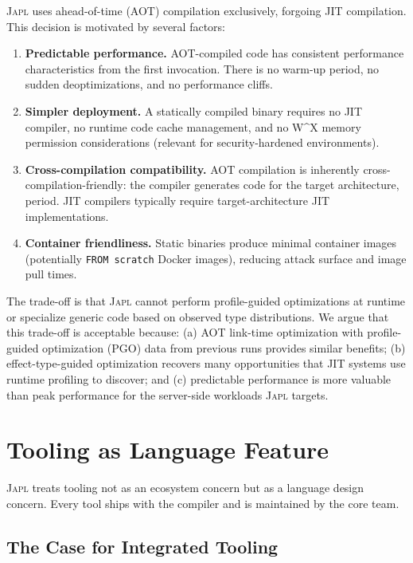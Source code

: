 \documentclass[11pt,twocolumn]{article}
\newcommand{\japl}{\textsc{Japl}}
\begin{document}
\japl{} uses ahead-of-time (AOT) compilation exclusively, forgoing JIT compilation.
This decision is motivated by several factors:

\begin{enumerate}[leftmargin=*]
\item \textbf{Predictable performance.} AOT-compiled code has consistent performance characteristics from the first invocation. There is no warm-up period, no sudden deoptimizations, and no performance cliffs.
\item \textbf{Simpler deployment.} A statically compiled binary requires no JIT compiler, no runtime code cache management, and no W\^{}X memory permission considerations (relevant for security-hardened environments).
\item \textbf{Cross-compilation compatibility.} AOT compilation is inherently cross-compilation-friendly: the compiler generates code for the target architecture, period. JIT compilers typically require target-architecture JIT implementations.
\item \textbf{Container friendliness.} Static binaries produce minimal container images (potentially \texttt{FROM scratch} Docker images), reducing attack surface and image pull times.
\end{enumerate}

The trade-off is that \japl{} cannot perform profile-guided optimizations at runtime or specialize generic code based on observed type distributions.
We argue that this trade-off is acceptable because:
(a) AOT link-time optimization with profile-guided optimization (PGO) data from previous runs provides similar benefits;
(b) effect-type-guided optimization recovers many opportunities that JIT systems use runtime profiling to discover; and
(c) predictable performance is more valuable than peak performance for the server-side workloads \japl{} targets.

\section{Tooling as Language Feature}
\label{sec:tooling}

\japl{} treats tooling not as an ecosystem concern but as a language design concern.
Every tool ships with the compiler and is maintained by the core team.

\subsection{The Case for Integrated Tooling}
\end{document}
